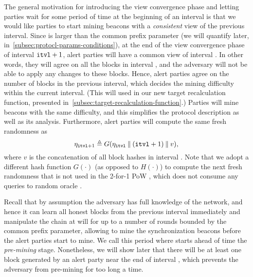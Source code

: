 The general motivation for introducing the view convergence phase and letting parties wait for some period of time at the beginning of an interval is that we would like parties to start mining beacons with a \emph{consistent} view of the previous interval.
%
Since \CPLen is larger than the common prefix parameter (we will quantify \CPLen later, in~\cref{subsec:protocl-params-conditions}), at the end of the view convergence phase of interval $\mathtt{itvl} + 1$, alert parties will have a common view of interval \interval.
%
In other words, they will agree on all the blocks in interval \interval, and the adversary \adv will not be able to apply any changes to these blocks.
%
Hence, alert parties agree on the number of blocks in the previous interval, which decides the mining difficulty within the current interval.
%
(This will used in our new target recalculation function, presented in~\cref{subsec:target-recalculation-function}.)
%
Parties will mine beacons with the same difficulty, and this simplifies the protocol description as well as its analysis.
%
Furthermore, alert parties will compute the same fresh randomness as
%
\begin{equation} \label{eq:compute-freshness}
    \eta_{\mathtt{itvl} + 1} \triangleq G(\eta_\mathtt{itvl} \mathbin\Vert (\mathtt{itvl} + 1) \mathbin\Vert v),
\end{equation}
%
where $v$ is the concatenation of all block hashes in interval \interval.
%
Note that we adopt a different hash function $G(\cdot)$ (as opposed to $H(\cdot)$) to compute the next fresh randomness that is not used in the 2-for-1 PoW , which does not consume any queries to random oracle \funcRO.

Recall that by assumption the adversary \adv has full knowledge of the network, and hence it can learn all honest blocks from the previous interval immediately and manipulate the chain at will for up to a number of rounds bounded by the common prefix parameter, allowing \adv to mine the synchronization beacons before the alert parties start to mine.
%
We call this period where \adv starts ahead of time the \emph{pre-mining} stage.
%
Nonetheless, we will show later that there will be at least one block generated by an alert party near the end of interval \interval, which prevents the adversary from pre-mining for too long a time.

